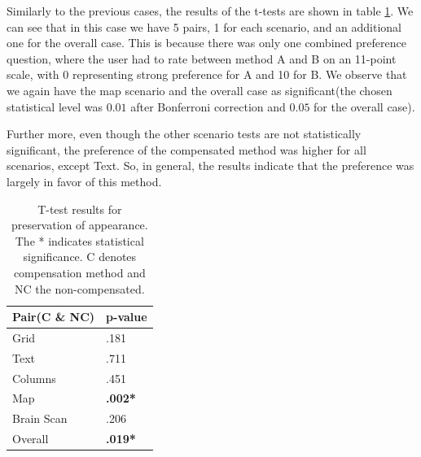 \documentclass[]{article}
\begin{document}
Similarly to the previous cases, the results of the t-tests are shown in table \ref{table:Preference_Test}. We can see that in this case we have 5 pairs, 1 for each scenario, and an additional one for the overall case. This is because there was only one combined preference question, where the user had to rate between method A and B on an 11-point scale, with 0 representing strong preference for A and 10 for B. We observe that we again have the map scenario and the overall case as significant(the chosen statistical level was $0.01$ after Bonferroni correction and $0.05$ for the overall case).

Further more, even though the other scenario tests are not statistically significant, the preference of the compensated method was higher for all scenarios, except Text. So, in general, the results indicate that the preference was largely in favor of this method.

\begin{table}
\begin{center}
    \begin{tabular}{ | l | l |}
    \hline
    \textbf{Pair(C \& NC)} & \textbf{p-value }\\ \hline
    Grid & .181 \\ \hline
    Text & .711 \\ \hline
    Columns & .451 \\ \hline
    Map & \textbf{.002*} \\ \hline
    Brain Scan & .206 \\ \hline
    Overall & \textbf{.019*} \\
    \hline
    \end{tabular}    
    
\end{center}
\caption{T-test results for preservation of appearance. The * indicates statistical significance. C denotes compensation method and NC the non-compensated.}
\label{table:Preference_Test}
\end{table}

\end{document}
